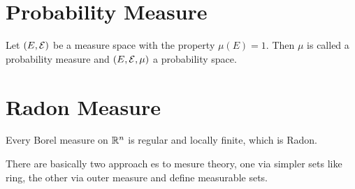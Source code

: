 \section{Probability Measure}

\begin{definition}
    Let $(E,\mathcal{E})$ be a measure space with the property $\mu(E)=1$.
    Then $\mu$ is called a probability measure and $(E,\mathcal{E},\mu)$ a probability space.
\end{definition}

\section{Radon Measure}

Every Borel measure on $\mathbb{R}^n$ is regular and locally finite, which is Radon.

There are basically two approach es to mesure theory, one via simpler sets like ring, the other via outer measure and define measurable sets.